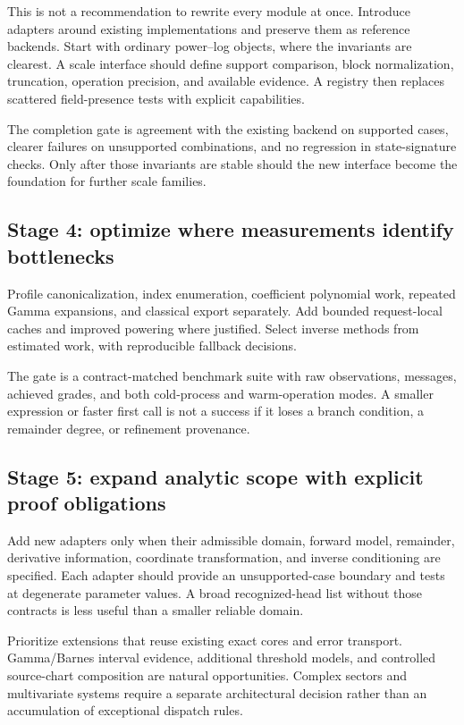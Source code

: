\documentclass[11pt,a4paper]{article}
\begin{document}
This is not a recommendation to rewrite every module at once. Introduce
adapters around existing implementations and preserve them as reference
backends. Start with ordinary power--log objects, where the invariants are
clearest. A scale interface should define support comparison, block
normalization, truncation, operation precision, and available evidence.
A registry then replaces scattered field-presence tests with explicit
capabilities.

The completion gate is agreement with the existing backend on supported
cases, clearer failures on unsupported combinations, and no regression in
state-signature checks. Only after those invariants are stable should the
new interface become the foundation for further scale families.

\subsection{Stage 4: optimize where measurements identify bottlenecks}
Profile canonicalization, index enumeration, coefficient polynomial work,
repeated Gamma expansions, and classical export separately. Add bounded
request-local caches and improved powering where justified. Select inverse
methods from estimated work, with reproducible fallback decisions.

The gate is a contract-matched benchmark suite with raw observations,
messages, achieved grades, and both cold-process and warm-operation modes.
A smaller expression or faster first call is not a success if it loses a
branch condition, a remainder degree, or refinement provenance.

\subsection{Stage 5: expand analytic scope with explicit proof obligations}
Add new adapters only when their admissible domain, forward model,
remainder, derivative information, coordinate transformation, and inverse
conditioning are specified. Each adapter should provide an unsupported-case
boundary and tests at degenerate parameter values. A broad recognized-head
list without those contracts is less useful than a smaller reliable domain.

Prioritize extensions that reuse existing exact cores and error transport.
Gamma/Barnes interval evidence, additional threshold models, and controlled
source-chart composition are natural opportunities. Complex sectors and
multivariate systems require a separate architectural decision rather than
an accumulation of exceptional dispatch rules.
\end{document}
